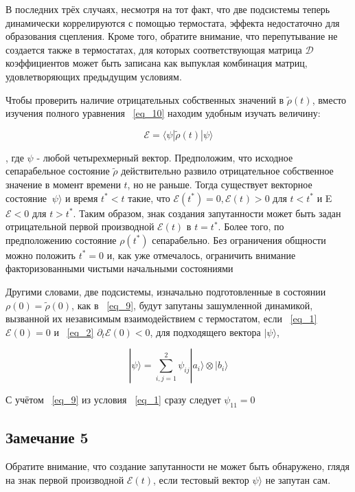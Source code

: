 \documentclass[11pt]{article}
\begin{document}
В последних трёх случаях, несмотря на тот факт, что две подсистемы теперь динамически коррелируются с помощью термостата, эффекта недостаточно для образования сцепления. Кроме того, обратите внимание, что перепутывание не создается также в термостатах, для которых соответствующая матрица $\mathscr{D}$ коэффициентов может быть записана как выпуклая комбинация матриц, удовлетворяющих предыдущим условиям.

Чтобы проверить наличие отрицательных собственных значений в $\tilde{\rho}(t)$, вместо изучения полного уравнения ~\ref{eq_10} находим удобным изучать величину:

\begin{equation}
\mathscr{E}=\langle \psi | \tilde{\rho}(t)|\psi \rangle
\label{eq_14}
\end{equation}

, где $\psi$ - любой четырехмерный вектор. Предположим, что исходное сепарабельное состояние $\tilde{\rho}$ действительно развило отрицательное собственное значение в момент времени $t$, но не раньше. Тогда существует векторное состояние $\ \psi \rangle$ и время $t^{*}<t$ такие, что $\mathscr{E}(t^{*})=0, \mathscr{E}(t^{})>0$ для $t<t^{*}$ и E $\mathscr{E}<0$ для $t> t^{*}$. Таким образом, знак создания запутанности может быть задан отрицательной первой производной $\mathscr{E}(t)$ в $t=t^{*}$. Более того, по предположению состояние $\rho(t^{*})$ сепарабельно. Без ограничения общности можно положить $t^{*}=0$ и, как уже отмечалось, ограничить внимание факторизованными чистыми начальными состояниями

Другими словами, две подсистемы, изначально подготовленные в состоянии $\rho(0)=\tilde{\rho}(0)$, как в ~\ref{eq_9}, будут запутаны зашумленной динамикой, вызванной их независимым взаимодействием с термостатом, если ~\ref{eq_1} $\mathscr{E}(0)=0$ и ~\ref{eq_2} $\partial_t \mathscr{E}(0) < 0$, для подходящего вектора $|\psi \rangle$,

\begin{equation}
|\psi \rangle = \sum\limits_{i,j=1}^2 \psi_{ij}|a_i \rangle \otimes |b_i \rangle
\label{eq_15}
\end{equation}

С учётом ~\ref{eq_9} из условия ~\ref{eq_1} сразу следует $\psi_{11}= 0$

\subsection{Замечание 5}
Обратите внимание, что создание запутанности не может быть обнаружено, глядя на знак первой производной $\mathscr{E}(t)$, если тестовый вектор $\psi \rangle$ не запутан сам.
\end{document}
